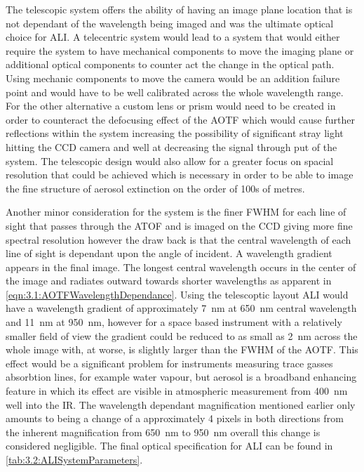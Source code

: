 \documentclass[12pt]{article}
\begin{document}
The telescopic system offers the ability of having an image plane location that is not dependant of the wavelength being imaged and was the ultimate optical choice for ALI. A telecentric system would lead to a system that would either require the system to have mechanical components to move the imaging plane or additional optical components to counter act the change in the optical path. Using mechanic components to move the camera would be an addition failure point and would have to be well calibrated across the whole wavelength range. For the other alternative a custom lens or prism would need to be created in order to counteract the defocusing effect of the AOTF which would cause further reflections within the system increasing the possibility of significant stray light hitting the CCD camera and well at decreasing the signal through put of the system. The telescopic design would also allow for a greater focus on spacial resolution that could be achieved which is necessary in order to be able to image the fine structure of aerosol extinction on the order of 100s of metres.

Another minor consideration for the system is the finer FWHM for each line of sight that passes through the ATOF and is imaged on the CCD giving more fine spectral resolution however the draw back is that the central wavelength of each line of sight is dependant upon the angle of incident. A wavelength gradient appears in the final image. The longest central wavelength occurs in the center of the image and radiates outward towards shorter wavelengths as apparent in \autoref{eqn:3.1:AOTFWavelengthDependance}. Using the telescoptic layout ALI would have a wavelength gradient of approximately 7~nm at 650~nm central wavelength and 11~nm at 950~nm, however for a space based instrument with a relatively smaller field of view the gradient could be reduced to as small as 2~nm across the whole image with, at worse, is slightly larger than the FWHM of the AOTF. This effect would be a significant problem for instruments measuring trace gasses absorbtion lines, for example water vapour, but aerosol is a broadband enhancing feature in which its effect are visible in atmospheric measurement from 400~nm well into the IR. The wavelength dependant magnification mentioned earlier only amounts to being a change of a approximately 4 pixels in both directions from the inherent magnification from 650~nm to 950~nm overall this change is considered negligible. The final optical specification for ALI can be found in \autoref{tab:3.2:ALISystemParameters}.
\end{document}
